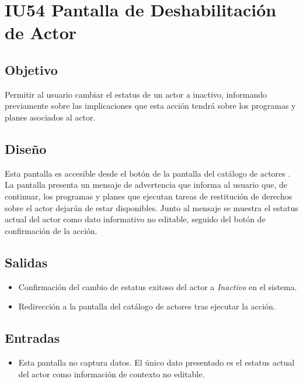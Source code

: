 \section{IU54 Pantalla de Deshabilitación de Actor}
\subsection{Objetivo}
Permitir al usuario cambiar el estatus de un actor a inactivo, informando 
previamente sobre las implicaciones que esta acción tendrá sobre los programas 
y planes asociados al actor.

\subsection{Diseño}
Esta pantalla  es accesible 
desde el botón  de la pantalla del catálogo de actores 
. La 
pantalla presenta un mensaje de advertencia que informa al usuario que, de 
continuar, los programas y planes que ejecutan tareas de restitución de derechos 
sobre el actor dejarán de estar disponibles. Junto al mensaje se muestra el 
estatus actual del actor como dato informativo no editable, seguido del botón 
de confirmación de la acción.


\subsection{Salidas}
\begin{itemize}
	\item Confirmación del cambio de estatus exitoso del actor a 
	\textit{Inactivo} en el sistema.
	\item Redirección a la pantalla del catálogo de actores 
	 tras 
	ejecutar la acción.
\end{itemize}

\subsection{Entradas}
\begin{itemize}
	\item Esta pantalla no captura datos. El único dato presentado es el estatus 
	actual del actor como información de contexto no editable.
\end{itemize}

